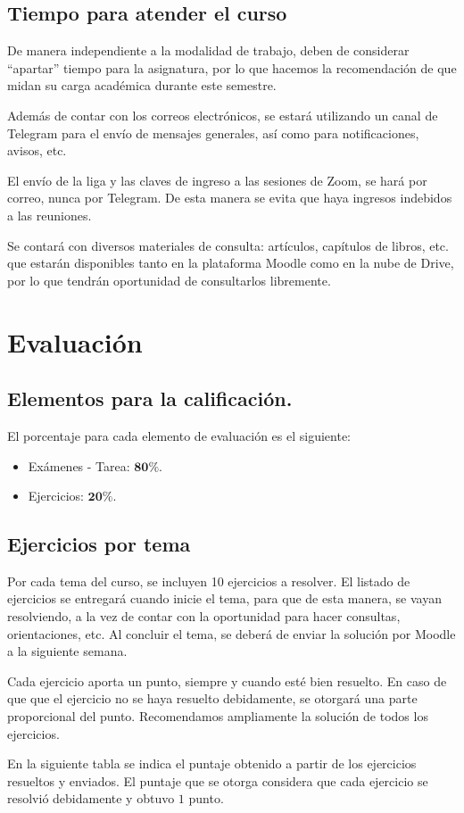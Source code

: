 \subsection{Tiempo para atender el curso}

De manera independiente a la modalidad de trabajo, deben de considerar \enquote{apartar} tiempo para la asignatura, por lo que hacemos la recomendación de que midan su carga académica durante este semestre.
\par
Además de contar con los correos electrónicos, se estará utilizando un canal de Telegram para el envío de mensajes generales, así como para notificaciones, avisos, etc.
\par
El envío de la liga y las claves de ingreso a las sesiones de Zoom, se hará por correo, nunca por Telegram. De esta manera se evita que haya ingresos indebidos a las reuniones.
\par
Se contará con diversos materiales de consulta: artículos, capítulos de libros, etc. que estarán disponibles tanto en la plataforma Moodle como en la nube de Drive, por lo que tendrán oportunidad de consultarlos libremente.

\section{Evaluación}

\subsection{Elementos para la calificación.}

El porcentaje para cada elemento de evaluación es el siguiente:
\begin{itemize}
\setlength{\itemsep}{0mm}
\item Exámenes - Tarea: $\mathbf{80\%}$.
\item Ejercicios: $\mathbf{20\%}$.
\end{itemize}

\subsection{Ejercicios por tema}

Por cada tema del curso, se incluyen 10 ejercicios a resolver. El listado de ejercicios se entregará cuando inicie el tema, para que de esta manera, se vayan resolviendo, a la vez de contar con la oportunidad para hacer consultas, orientaciones, etc.  Al concluir el tema, se deberá de enviar la solución por Moodle a la siguiente semana.
\par
Cada ejercicio aporta un punto, siempre y cuando esté bien resuelto. En caso de que que el ejercicio no se haya resuelto debidamente, se otorgará una parte proporcional del punto. Recomendamos ampliamente la solución de todos los ejercicios.
\par
En la siguiente tabla se indica el puntaje obtenido a partir de los ejercicios resueltos y enviados. El puntaje que se otorga considera que cada ejercicio se resolvió debidamente y obtuvo $1$ punto.

